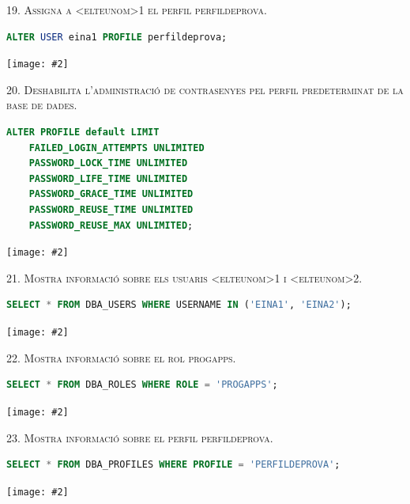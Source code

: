 \documentclass[a4paper,12pt]{article}
\newcommand{\mygraphic}[2][width=\textwidth]{\begin{center}
		\centering\texttt{[image: \#2]}\par
\end{center}}
\begin{document}
\newpage
\textsc{19. Assigna a <elteunom>1 el perfil perfildeprova.}
\begin{lstlisting}[language=SQL]
ALTER USER eina1 PROFILE perfildeprova;
\end{lstlisting}
\mygraphic{imatges/19.png}

\newpage
\textsc{20. Deshabilita l'administració de contrasenyes pel perfil predeterminat de la base de dades.}
\begin{lstlisting}[language=SQL]
ALTER PROFILE default LIMIT
	FAILED_LOGIN_ATTEMPTS UNLIMITED
	PASSWORD_LOCK_TIME UNLIMITED
	PASSWORD_LIFE_TIME UNLIMITED
	PASSWORD_GRACE_TIME UNLIMITED
	PASSWORD_REUSE_TIME UNLIMITED
	PASSWORD_REUSE_MAX UNLIMITED;
\end{lstlisting}
\mygraphic{imatges/20.png}

\newpage
\textsc{21. Mostra informació sobre els usuaris <elteunom>1 i <elteunom>2.}
\begin{lstlisting}[language=SQL]
SELECT * FROM DBA_USERS WHERE USERNAME IN ('EINA1', 'EINA2');
\end{lstlisting}
\mygraphic{imatges/21.png}

\textsc{22. Mostra informació sobre el rol progapps.}
\begin{lstlisting}[language=SQL]
SELECT * FROM DBA_ROLES WHERE ROLE = 'PROGAPPS';
\end{lstlisting}
\mygraphic{imatges/22.png}

\newpage
\textsc{23. Mostra informació sobre el perfil perfildeprova.}
\begin{lstlisting}[language=SQL]
SELECT * FROM DBA_PROFILES WHERE PROFILE = 'PERFILDEPROVA';
\end{lstlisting}
\mygraphic{imatges/23.png}
\end{document}
